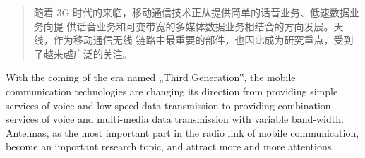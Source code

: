 \documentclass[UTF8,AutoFakeBold=1,AutoFakeSlant,zihao=-4,twoside]{cucthesis_color}
\begin{document}
\coverpage
\statement
\begin{abstract}
随着 3G 时代的来临，移动通信技术正从提供简单的话音业务、低速数据业务向提
供话音业务和可变带宽的多媒体数据业务相结合的方向发展。天线，作为移动通信无线
链路中最重要的部件，也因此成为研究重点，受到了越来越广泛的关注。

\end{abstract}

\begin{abstractEN}
With the coming of the era named „Third Generation‟, the mobile communication 
technologies are changing its direction from providing simple services of voice and low speed 
data transmission to providing combination services of voice and multi-media data 
transmission with variable band-width. Antennas, as the most important part in the radio link 
of mobile communication, become an important research topic, and attract more and more 
attentions.

\end{abstractEN}

\contentpage







\begin{references}
    
\end{references}

\end{document}
